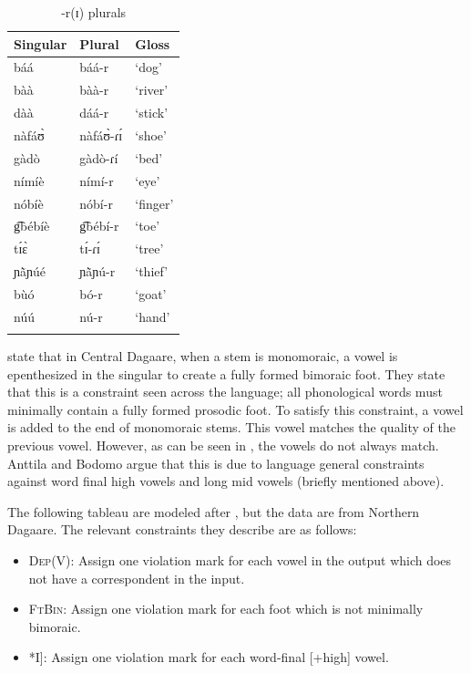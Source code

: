 \documentclass[output=paper,colorlinks,citecolor=brown,
]{langscibook}
\begin{document}
\begin{table}

  \caption{-r(ɪ) plurals}
  \label{tab:Caragine:rPluralsComb}
  
\begin{tabular}{lll}
\lsptoprule 
Singular & Plural & Gloss\\
\midrule\midrule
báá & báá-r & `dog'\\
bàà & bàà-r & `river'\\
dàà & dáá-r & `stick'\\
nàfáʊ̀ & nàfáʊ̀-ɾɪ́ & `shoe'\\
gàdò & gàdò-ɾí & `bed'\\
\midrule\midrule
nímíè & nímí-r & `eye'\\
nóbíè & nóbí-r & `finger'\\
g͡bébíè & g͡bébí-r & `toe'\\
tɪ́ɛ̀ & tɪ́-ɾɪ́ & `tree'\\
ɲã̀ɲúé & ɲã̀ɲú-r & `thief'\\
bùó & bó-r & `goat'\\
núú & nú-r & `hand'\\
\lspbottomrule 

\end{tabular}
\end{table}

\citet{anttilaProsodic2009} state that in Central Dagaare, when a stem is monomoraic, a vowel is epenthesized in the singular to create a fully formed bimoraic foot. They state that this is a constraint seen across the language; all phonological words must minimally contain a fully formed prosodic foot. To satisfy this constraint, a vowel is added to the end of monomoraic stems. This vowel matches the quality of the previous vowel. However, as can be seen in , the vowels do not always match. Anttila and Bodomo argue that this is due to language general constraints against word final high vowels and long mid vowels (briefly mentioned above).

The following tableau are modeled after \cite{anttilaProsodic2009}, but the data are from Northern Dagaare. The relevant constraints they describe are as follows: 

\ea \label{ex:Caragine:HeIsInsideTheHouse} \begin{itemize}
    \item[a.] \textsc{Dep}(V):	Assign one violation mark for each vowel in the output which does not have a correspondent in the input.\\
    \item[b.] \textsc{FtBin}: Assign one violation mark for each foot which is not minimally bimoraic.\\
    \item[c.] *I]:	Assign one violation mark for each word-final [+high] vowel.\\
\end{itemize}
\z
\end{document}
